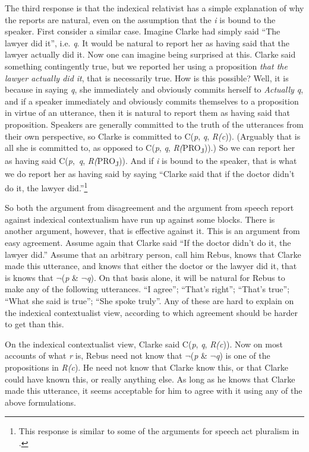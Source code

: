 The third response is that the indexical relativist has a simple explanation of why the reports are natural, even on the assumption that the \textit{i} is bound to the speaker. First consider a similar case. Imagine Clarke had simply said ``The lawyer did it'', i.e. \textit{q}. It would be natural to report her as having said that the lawyer actually did it. Now one can imagine being surprised at this. Clarke said something contingently true, but we reported her using a proposition \textit{that the lawyer actually did it}, that is necessarily true. How is this possible? Well, it is because in saying \textit{q}, she immediately and obviously commits herself to \textit{Actually q}, and if a speaker immediately and obviously commits themselves to a proposition in virtue of an utterance, then it is natural to report them as having said that proposition. Speakers are generally committed to the truth of the utterances from their own perspective, so Clarke is committed to C(\textit{p}, \textit{q}, \textit{R(c})). (Arguably that is all she is committed to, as opposed to C(\textit{p}, \textit{q}, \textit{R(}PRO\textsubscript{J})).) So we can report her as having said C(\textit{p},~\textit{q}, \textit{R(}PRO\textsubscript{J})). And if \textit{i} is bound to the speaker, that is what we do report her as having said by saying ``Clarke said that if the doctor didn't do it, the lawyer did.''\footnote{ This response is similar to some of the arguments for speech act pluralism in \cite{Cappelen2005}.}

So both the argument from disagreement and the argument from speech report against indexical contextualism have run up against some blocks. There is another argument, however, that is effective against it. This is an argument from easy agreement. Assume again that Clarke said ``If the doctor didn't do it, the lawyer did.'' Assume that an arbitrary person, call him Rebus, knows that Clarke made this utterance, and knows that either the doctor or the lawyer did it, that is knows that \(\neg\){}(\textit{p} \& \(\neg\){}\textit{q}). On that basis alone, it will be natural for Rebus to make any of the following utterances. ``I agree''; ``That's right''; ``That's true''; ``What she said is true''; ``She spoke truly''. Any of these are hard to explain on the indexical contextualist view, according to which agreement should be harder to get than this.

On the indexical contextualist view, Clarke said C(\textit{p}, \textit{q}, \textit{R(c})). Now on most accounts of what \textit{r} is, Rebus need not know that \(\neg\){}(\textit{p} \& \(\neg\){}\textit{q}) is one of the propositions in \textit{R(c}). He need not know that Clarke know this, or that Clarke could have known this, or really anything else. As long as he knows that Clarke made this utterance, it seems acceptable for him to agree with it using any of the above formulations.

